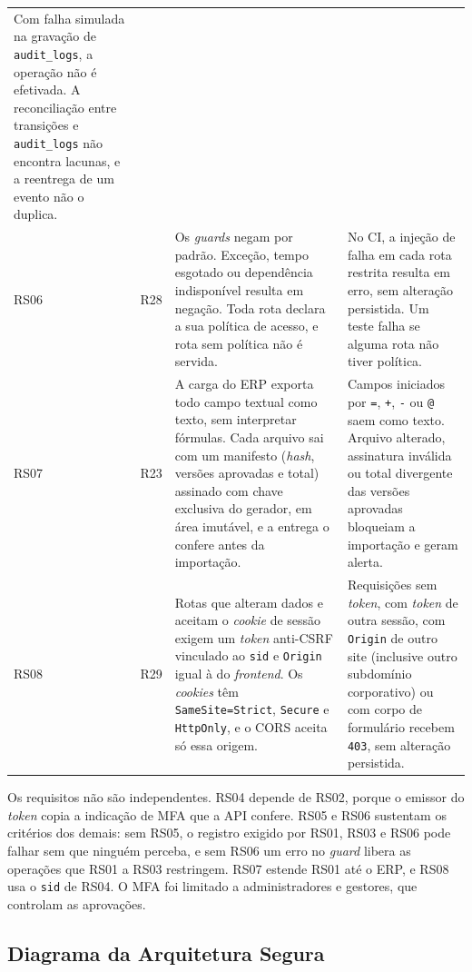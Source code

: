 \documentclass[conference]{IEEEtran}
\begin{document}
\begin{table}[!t]
\begin{tabularx}{\textwidth}{@{}l l Y Y@{}}
Com falha simulada na gravação de \texttt{audit\_logs}, a operação não é efetivada. A reconciliação entre transições e \texttt{audit\_logs} não encontra lacunas, e a reentrega de um evento não o duplica. \\
RS06 & R28 &
Os \textit{guards} negam por padrão. Exceção, tempo esgotado ou dependência indisponível resulta em negação. Toda rota declara a sua política de acesso, e rota sem política não é servida. &
No CI, a injeção de falha em cada rota restrita resulta em erro, sem alteração persistida. Um teste falha se alguma rota não tiver política. \\
RS07 & R23 &
A carga do ERP exporta todo campo textual como texto, sem interpretar fórmulas. Cada arquivo sai com um manifesto (\textit{hash}, versões aprovadas e total) assinado com chave exclusiva do gerador, em área imutável, e a entrega o confere antes da importação. &
Campos iniciados por \texttt{=}, \texttt{+}, \texttt{-} ou \texttt{@} saem como texto. Arquivo alterado, assinatura inválida ou total divergente das versões aprovadas bloqueiam a importação e geram alerta. \\
RS08 & R29 &
Rotas que alteram dados e aceitam o \textit{cookie} de sessão exigem um \textit{token} anti-CSRF vinculado ao \texttt{sid} e \texttt{Origin} igual à do \textit{frontend}. Os \textit{cookies} têm \texttt{SameSite=Strict}, \texttt{Secure} e \texttt{HttpOnly}, e o CORS aceita só essa origem. &
Requisições sem \textit{token}, com \textit{token} de outra sessão, com \texttt{Origin} de outro site (inclusive outro subdomínio corporativo) ou com corpo de formulário recebem \texttt{403}, sem alteração persistida. \\
\hline
\end{tabularx}
\end{table}

Os requisitos não são independentes. RS04 depende de RS02, porque o emissor do \textit{token} copia a indicação de MFA que a API confere. RS05 e RS06 sustentam os critérios dos demais: sem RS05, o registro exigido por RS01, RS03 e RS06 pode falhar sem que ninguém perceba, e sem RS06 um erro no \textit{guard} libera as operações que RS01 a RS03 restringem. RS07 estende RS01 até o ERP, e RS08 usa o \texttt{sid} de RS04. O MFA foi limitado a administradores e gestores, que controlam as aprovações.

\subsection{Diagrama da Arquitetura Segura}
\label{subsec:diagrama}
\end{document}
